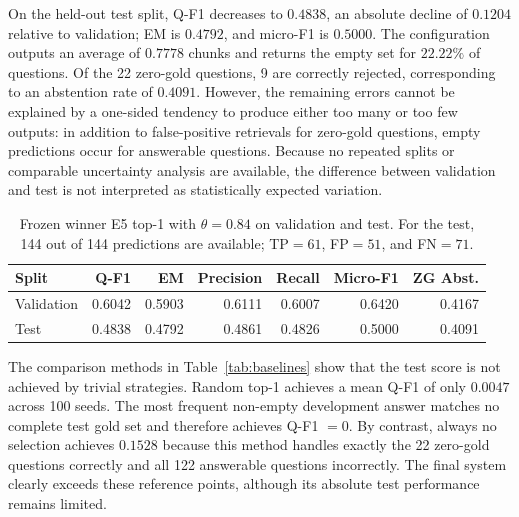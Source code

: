 \documentclass[11pt]{article}
\begin{document}
On the held-out test split, Q-F1 decreases to $0.4838$, an absolute decline of $0.1204$ relative to validation; EM is $0.4792$, and micro-F1 is $0.5000$. The configuration outputs an average of $0.7778$ chunks and returns the empty set for $22.22\%$ of questions. Of the 22 zero-gold questions, 9 are correctly rejected, corresponding to an abstention rate of $0.4091$. However, the remaining errors cannot be explained by a one-sided tendency to produce either too many or too few outputs: in addition to false-positive retrievals for zero-gold questions, empty predictions occur for answerable questions. Because no repeated splits or comparable uncertainty analysis are available, the difference between validation and test is not interpreted as statistically expected variation.

\begin{table}[t]
\centering
\small
\begin{tabular}{lrrrrrr}
\toprule
\textbf{Split} & \textbf{Q-F1} & \textbf{EM} & \textbf{Precision} & \textbf{Recall} & \textbf{Micro-F1} & \textbf{ZG Abst.} \\
\midrule
Validation & 0.6042 & 0.5903 & 0.6111 & 0.6007 & 0.6420 & 0.4167 \\
Test & 0.4838 & 0.4792 & 0.4861 & 0.4826 & 0.5000 & 0.4091 \\
\bottomrule
\end{tabular}
\caption{Frozen winner E5 top-1 with $\theta=0.84$ on validation and test. For the test, 144 out of 144 predictions are available; TP${}=61$, FP${}=51$, and FN${}=71$.}
\label{tab:final-system}
\end{table}

The comparison methods in Table~\ref{tab:baselines} show that the test score is not achieved by trivial strategies. Random top-1 achieves a mean Q-F1 of only $0.0047$ across 100 seeds. The most frequent non-empty development answer matches no complete test gold set and therefore achieves Q-F1 $=0$. By contrast, always no selection achieves $0.1528$ because this method handles exactly the 22 zero-gold questions correctly and all 122 answerable questions incorrectly. The final system clearly exceeds these reference points, although its absolute test performance remains limited.
\end{document}
